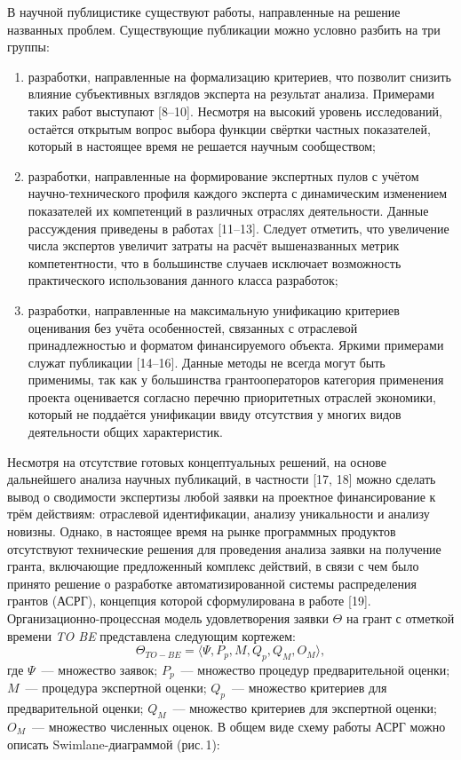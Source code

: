 В научной публицистике существуют работы, направленные на решение названных проблем. Существующие публикации можно условно разбить на три группы:
\begin{enumerate}[noitemsep]
  \item разработки, направленные на формализацию критериев, что позволит снизить влияние субъективных взглядов эксперта на результат анализа. Примерами таких работ выступают [8--10]. Несмотря на высокий уровень исследований, остаётся открытым вопрос выбора функции свёртки частных показателей, который в настоящее время не решается научным сообществом;
  \item разработки, направленные на формирование экспертных пулов с учётом научно-технического профиля каждого эксперта с динамическим изменением показателей их компетенций в различных отраслях деятельности. Данные рассуждения приведены в работах [11--13]. Следует отметить, что увеличение числа экспертов увеличит затраты на расчёт вышеназванных метрик компетентности, что в большинстве случаев исключает возможность практического использования данного класса разработок;
  \item разработки, направленные на максимальную унификацию критериев оценивания без учёта особенностей, связанных с отраслевой принадлежностью и форматом финансируемого объекта. Яркими примерами служат публикации [14--16]. Данные методы не всегда могут быть применимы, так как у большинства грантооператоров категория применения проекта оценивается согласно перечню приоритетных отраслей экономики, который не поддаётся унификации ввиду отсутствия у многих видов деятельности общих характеристик.
\end{enumerate}

Несмотря на отсутствие готовых концептуальных решений, на основе дальнейшего анализа научных публикаций, в частности [17, 18] можно сделать вывод о сводимости экспертизы любой заявки на проектное финансирование к трём действиям: отраслевой идентификации, анализу уникальности и анализу новизны. Однако, в настоящее время на рынке программных продуктов отсутствуют технические решения для проведения анализа заявки на получение гранта, включающие предложенный комплекс действий, в связи с чем было принято решение о разработке автоматизированной системы распределения грантов (АСРГ), концепция которой сформулирована в работе [19]. Организационно-процессная модель удовлетворения заявки $\Theta$ на грант с отметкой времени \textit{TO BE} представлена следующим кортежем:
\begin{equation}
  \Theta_{TO-BE} = \langle \Psi, P_p, M, Q_p, Q_M, O_M \rangle,
\end{equation}
где $\Psi$~--- множество заявок; $P_p$~--- множество процедур предварительной оценки; $M$~--- процедура экспертной оценки; $Q_p$~--- множество критериев для предварительной оценки; $Q_M$~--- множество критериев для экспертной оценки; $O_M$~--- множество численных оценок. В общем виде схему работы АСРГ можно описать Swimlane-диаграммой (рис.\,1):

